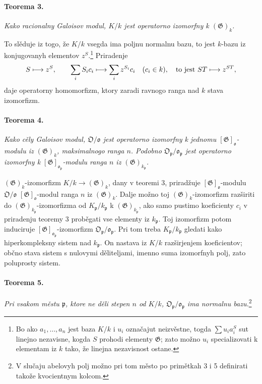\documentclass[11pt]{article}
\providecommand{\frakO}{\mathfrak{O}}
\providecommand{\frako}{\mathfrak{o}}
\providecommand{\frakp}{\mathfrak{p}}
\providecommand{\Gg}{\mathfrak{G}}
\begin{document}
\paragraph{Teorema 3.}
\emph{Kako racionalny Galoisov modul, \(K/k\) jest operatorno izomorfny k \((\Gg)_k\).}

To slěduje iz togo, že \(K/k\) vsegda ima poljnu normalnu bazu, to jest \(k\)-bazu iz konjugovanyh elementov \(z^S\).\footnote{Bo ako \(a_1,\ldots,a_n\) jest baza \(K/k\) i \(u_i\) označajut neizvěstne, togda \(\sum u_i a_i^S\) sut linejno nezavisne, kogda \(S\) prohodi elementy \(\Gg\); zato možno \(u_i\) specializovati k elementam iz \(k\) tako, že linejna nezavisnost ostane.} Priradenje
\[
        S\longmapsto z^S,
        \qquad
        \sum_i S_i c_i\longmapsto \sum_i z^{S_i}c_i
        \quad(c_i\in k),
        \quad\hbox{to jest } ST\longmapsto z^{ST},
\]
daje operatorny homomorfizm, ktory zaradi ravnogo ranga nad \(k\) stava izomorfizm.

\paragraph{Teorema 4.}
\emph{Kako cěly Galoisov modul, \(\frakO/\frako\) jest operatorno izomorfny k jednomu \([\Gg]_\frako\)-modulu iz \((\Gg)_k\), maksimalnogo ranga \(n\). Podobno \(\frakO_\frakp/\frako_\frakp\) jest operatorno izomorfny k \([\Gg]_{\frako_\frakp}\)-modulu ranga \(n\) iz \((\Gg)_{k_\frakp}\).}

\((\Gg)_k\)-izomorfizm \(K/k\to(\Gg)_k\), dany v teoremi 3, priradžuje \([\Gg]_\frako\)-modulu \(\frakO/\frako\) \([\Gg]_\frako\)-modul ranga \(n\) iz \((\Gg)_k\). Dalje možno toj \((\Gg)_k\)-izomorfizm razširiti do \((\Gg)_{k_\frakp}\)-izomorfizma od \(K_\frakp/k_\frakp\) k \((\Gg)_{k_\frakp}\), ako samo pustimo koeficienty \(c_i\) v priradenju teoremy 3 proběgati vse elementy iz \(k_\frakp\). Toj izomorfizm potom induciruje \([\Gg]_{\frako_\frakp}\)-izomorfizm \(\frakO_\frakp/\frako_\frakp\). Pri tom treba \(K_\frakp/k_\frakp\) gledati kako hiperkompleksny sistem nad \(k_\frakp\). On nastava iz \(K/k\) razširjenjem koeficientov; občno stava sistem s nulovymi děliteljami, imenno suma izomorfnyh polj, zato poluprosty sistem.

\paragraph{Teorema 5.}
\emph{Pri vsakom městu \(\frakp\), ktore ne děli stepen \(n\) od \(K/k\), \(\frakO_\frakp/\frako_\frakp\) ima normalnu bazu.}\footnote{V slučaju abelovyh polj možno pri tom město po primětkah 3 i 5 definirati takože kvocientnym kolcom.}
\end{document}
